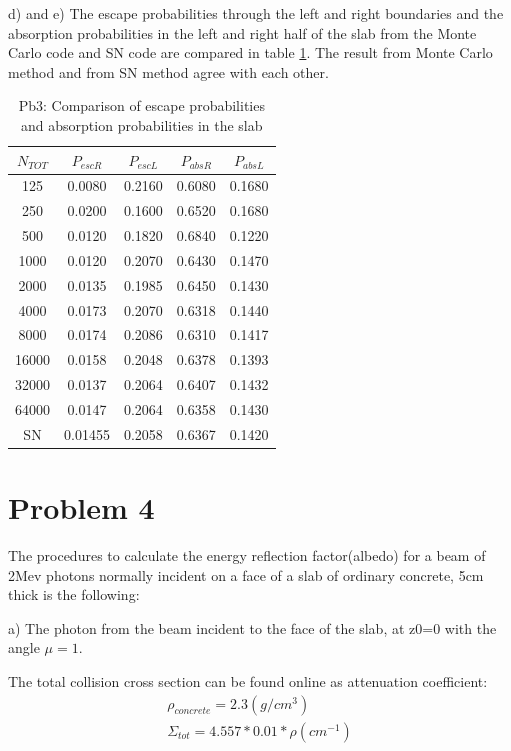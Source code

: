 \documentclass[paper=a4, fontsize=11pt]{article} %
\newcommand{\ra}[1]{\renewcommand{\arraystretch}{#1}}
\begin{document}
d) and e) The escape probabilities through the left and right boundaries and the absorption probabilities in the left and right half of the slab from the Monte Carlo code and SN code are compared in table \ref{pb3}. The result from Monte Carlo method and from SN method agree with each other. 

\begin{table}[h!]\centering
\ra{1.3}
\begin{tabular}{ccccc}\toprule
 $N_{TOT}$ & $P_{escR}$ & $P_{escL}$ & $P_{absR}$ &$P_{absL}$ \\ \midrule
  125   & 0.0080 & 0.2160 & 0.6080 & 0.1680 \\
  250   & 0.0200 & 0.1600 & 0.6520 & 0.1680\\
  500   & 0.0120 & 0.1820 & 0.6840 & 0.1220\\
  1000  & 0.0120 & 0.2070 & 0.6430 & 0.1470\\
  2000  & 0.0135 & 0.1985 & 0.6450 & 0.1430\\
  4000  & 0.0173 & 0.2070 & 0.6318 & 0.1440\\
  8000  & 0.0174 & 0.2086 & 0.6310 & 0.1417\\
  16000 & 0.0158 & 0.2048 & 0.6378 & 0.1393\\
  32000 & 0.0137 & 0.2064 & 0.6407 & 0.1432\\
  64000 & 0.0147 & 0.2064 & 0.6358 & 0.1430\\
  SN    & 0.01455 & 0.2058 & 0.6367 & 0.1420\\
\bottomrule
\end{tabular}
\caption{Pb3: Comparison of escape probabilities and absorption probabilities in the slab}
\label{pb3}
\end{table}

\clearpage
\section*{Problem 4}
The procedures to calculate the energy reflection factor(albedo) for a beam of 2Mev photons normally incident on a face of a slab of ordinary concrete, 5cm thick is the following:

a) The photon from the beam incident to the face of the slab, at z0=0 with the angle $\mu = 1$. 

The total collision cross section can be found online as attenuation coefficient:
\begin{eqnarray}
\rho_{concrete} = 2.3 (g/cm^3) \nonumber\\
\Sigma_{tot} = 4.557 * 0.01 * \rho (cm ^{-1})
\end{eqnarray}
\end{document}
